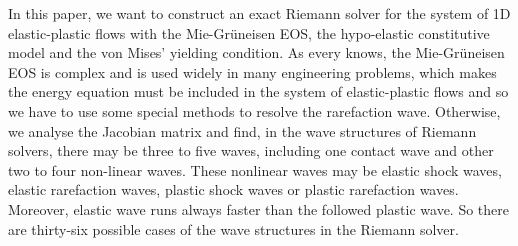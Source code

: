 \documentclass{article}
\numberwithin{equation}{section}
\numberwithin{table}{section}
\begin{document}

In this paper, we want to construct an exact Riemann solver for the system of 1D elastic-plastic flows with the Mie-Gr\"uneisen EOS, the hypo-elastic constitutive model and the von Mises' yielding condition. As every knows, the Mie-Gr\"uneisen EOS is complex and is used widely  in many engineering problems, which makes the energy equation must be included in the system of elastic-plastic flows and so we have to use some special methods to resolve the rarefaction wave. Otherwise, we analyse the Jacobian matrix and find, in the wave structures of Riemann solvers, there may be three to five waves, including one contact wave and other two to four non-linear waves. These nonlinear waves may be elastic shock waves, elastic rarefaction waves,  plastic shock waves or plastic rarefaction waves. Moreover, elastic wave runs always faster than the followed plastic wave. So there are thirty-six possible cases of the wave structures in the Riemann solver.
\end{document}
